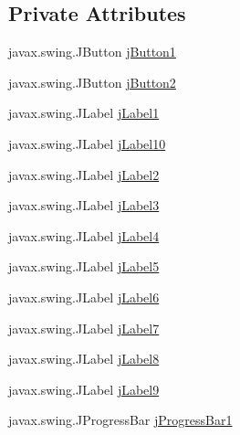 \subsection*{Private Attributes}
\begin{DoxyCompactItemize}
\item 
javax.\+swing.\+J\+Button \mbox{\hyperlink{class_interfaz_package_1_1_alta_diccionario_a0f3026ebbc0c7a84616c54c8279221e6}{j\+Button1}}
\item 
javax.\+swing.\+J\+Button \mbox{\hyperlink{class_interfaz_package_1_1_alta_diccionario_a521eb08d96dea01d2c690fcbf9804e57}{j\+Button2}}
\item 
javax.\+swing.\+J\+Label \mbox{\hyperlink{class_interfaz_package_1_1_alta_diccionario_af8a39de35277501b7801eaf2c5ccbf33}{j\+Label1}}
\item 
javax.\+swing.\+J\+Label \mbox{\hyperlink{class_interfaz_package_1_1_alta_diccionario_a49c268b57b92d0d57a86f0350e887083}{j\+Label10}}
\item 
javax.\+swing.\+J\+Label \mbox{\hyperlink{class_interfaz_package_1_1_alta_diccionario_ab2913168b8ce8c2e33af1a06a91424a1}{j\+Label2}}
\item 
javax.\+swing.\+J\+Label \mbox{\hyperlink{class_interfaz_package_1_1_alta_diccionario_a4acae592782e66c775de54bfe425ea0d}{j\+Label3}}
\item 
javax.\+swing.\+J\+Label \mbox{\hyperlink{class_interfaz_package_1_1_alta_diccionario_ace70621c67ef90297d4ff752d97c97c4}{j\+Label4}}
\item 
javax.\+swing.\+J\+Label \mbox{\hyperlink{class_interfaz_package_1_1_alta_diccionario_af33a0210b14d80015c323d59ca84e134}{j\+Label5}}
\item 
javax.\+swing.\+J\+Label \mbox{\hyperlink{class_interfaz_package_1_1_alta_diccionario_a0c561754fd465af966a7cc6a1bc44e0b}{j\+Label6}}
\item 
javax.\+swing.\+J\+Label \mbox{\hyperlink{class_interfaz_package_1_1_alta_diccionario_a6b9331f8fb5ef9724ed7f357a9161928}{j\+Label7}}
\item 
javax.\+swing.\+J\+Label \mbox{\hyperlink{class_interfaz_package_1_1_alta_diccionario_a11b6f4d3aa1422c2bf0b283f64e86c29}{j\+Label8}}
\item 
javax.\+swing.\+J\+Label \mbox{\hyperlink{class_interfaz_package_1_1_alta_diccionario_a1292835cd1c494573c6e62a250c99f55}{j\+Label9}}
\item 
javax.\+swing.\+J\+Progress\+Bar \mbox{\hyperlink{class_interfaz_package_1_1_alta_diccionario_a708a5b8c6cc94306cd57109ba082a3af}{j\+Progress\+Bar1}}

\end{DoxyCompactItemize}

